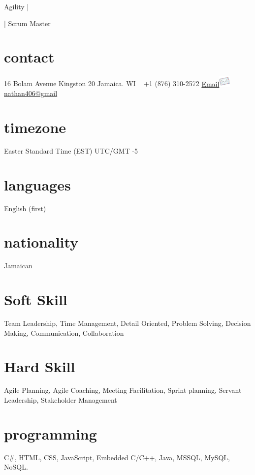 \documentclass[]{friggeri-cvRS}
\begin{document}
	{Agility |  | Scrum Master}



\begin{aside}
  \section{contact}
   16 Bolam Avenue
   Kingston 20
    Jamaica. WI
    ~
    +1 (876) 310-2572
    \href{mailto:nathan406@gmail.com}{Email\includegraphics[height=16pt]{images/email.png}
    nathan406@gmail}
    \section{timezone}
    Easter Standard Time (EST)
    UTC/GMT -5
    \section{languages}
    English (first)
    \section{nationality}
    Jamaican
    \section{Soft Skill}
     Team Leadership, Time Management, Detail Oriented, Problem Solving, Decision Making, Communication, Collaboration
    \section{Hard Skill}
     Agile Planning, Agile Coaching, Meeting Facilitation, Sprint planning, Servant Leadership, Stakeholder Management
    \section{programming}
     C\#, HTML, CSS, JavaScript, Embedded C/C++, Java, MSSQL, MySQL, NoSQL.
\end{aside}
\end{document}
